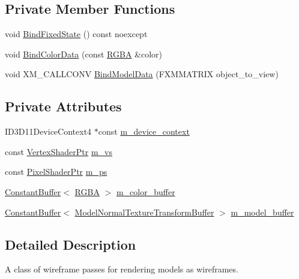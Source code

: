 \subsection*{Private Member Functions}
\begin{DoxyCompactItemize}
\item 
void \hyperlink{classmage_1_1_wireframe_pass_a8342bc185967b33cd585a9042fd9418d}{Bind\+Fixed\+State} () const noexcept
\item 
void \hyperlink{classmage_1_1_wireframe_pass_aaf16a7d1b6c9d38ac1bf8aa97b7a8b11}{Bind\+Color\+Data} (const \hyperlink{structmage_1_1_r_g_b_a}{R\+G\+BA} \&color)
\item 
void X\+M\+\_\+\+C\+A\+L\+L\+C\+O\+NV \hyperlink{classmage_1_1_wireframe_pass_a6e316eaabf3afb71162490c1f3c244f3}{Bind\+Model\+Data} (F\+X\+M\+M\+A\+T\+R\+IX object\+\_\+to\+\_\+view)
\end{DoxyCompactItemize}
\subsection*{Private Attributes}
\begin{DoxyCompactItemize}
\item 
I\+D3\+D11\+Device\+Context4 $\ast$const \hyperlink{classmage_1_1_wireframe_pass_ac0f6bc1488ab515fe00d6e7abf230636}{m\+\_\+device\+\_\+context}
\item 
const \hyperlink{namespacemage_a1f19b094f771e30bc0a6c1cebcc0dd58}{Vertex\+Shader\+Ptr} \hyperlink{classmage_1_1_wireframe_pass_ab128eede9f9f4afa20e9e59c249eea1f}{m\+\_\+vs}
\item 
const \hyperlink{namespacemage_acbec875bb5e5e085e32ed244a24d2b6f}{Pixel\+Shader\+Ptr} \hyperlink{classmage_1_1_wireframe_pass_a69da5f7e268b4265838bb6b378ed3061}{m\+\_\+ps}
\item 
\hyperlink{classmage_1_1_constant_buffer}{Constant\+Buffer}$<$ \hyperlink{structmage_1_1_r_g_b_a}{R\+G\+BA} $>$ \hyperlink{classmage_1_1_wireframe_pass_acb2aaf33841a4f08edb50f9b72637d93}{m\+\_\+color\+\_\+buffer}
\item 
\hyperlink{classmage_1_1_constant_buffer}{Constant\+Buffer}$<$ \hyperlink{structmage_1_1_model_normal_texture_transform_buffer}{Model\+Normal\+Texture\+Transform\+Buffer} $>$ \hyperlink{classmage_1_1_wireframe_pass_aa7fb7cbba08fe8b4d7defab36d2e82a7}{m\+\_\+model\+\_\+buffer}
\end{DoxyCompactItemize}


\subsection{Detailed Description}
A class of wireframe passes for rendering models as wireframes. 

